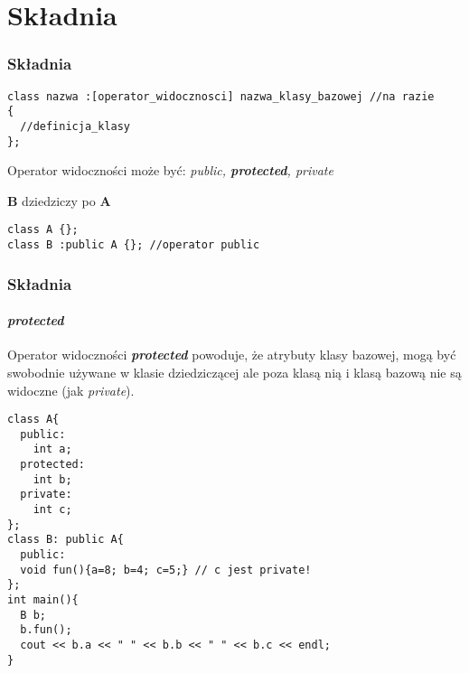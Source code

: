 \documentclass[10pt]{beamer}
\begin{document}
\section{Składnia}

\begin{frame}[fragile]
  \frametitle{Składnia}
  \begin{center}
\begin{lstlisting}
class nazwa :[operator_widocznosci] nazwa_klasy_bazowej //na razie
{
  //definicja_klasy
};
\end{lstlisting}
  Operator widoczności może być: \textit{public, \textbf{protected}, private}\\ \vspace{0.5cm}

  \textbf{B} dziedziczy po \textbf{A}  
\begin{lstlisting}
class A {};
class B :public A {}; //operator public
\end{lstlisting}
  \centering
\end{center}
\end{frame}

\begin{frame}[fragile]
  \frametitle{Składnia}
  \framesubtitle{\textbf{\textit{protected}}}
  \centering
  \vspace{-0.5cm}
  Operator widoczności \textit{\textbf{protected}} powoduje, że atrybuty klasy bazowej,
  mogą być swobodnie używane w klasie dziedziczącej ale poza klasą nią
  i klasą bazową nie są widoczne (jak \textit{private}).
  \newline
\begin{lstlisting}
class A{
  public:
    int a;
  protected:
    int b;
  private:
    int c;
};
class B: public A{
  public:
  void fun(){a=8; b=4; c=5;} // c jest private!
};
int main(){
  B b;
  b.fun();
  cout << b.a << " " << b.b << " " << b.c << endl;
}
\end{lstlisting}
\end{frame}
\end{document}
